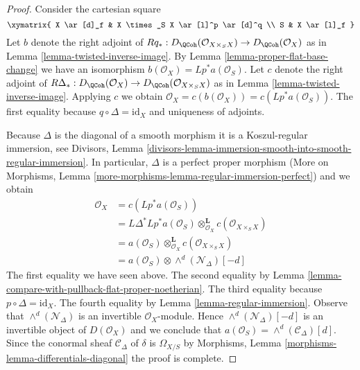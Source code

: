 \begin{proof}
Consider the cartesian square
$$
\xymatrix{
X \ar[d]_f & X \times_S X \ar[l]^p \ar[d]^q \\
S & X \ar[l]_f
}
$$
Let $b$ denote the right adjoint of
$Rq_* : D_\QCoh(\mathcal{O}_{X \times_S X}) \to D_\QCoh(\mathcal{O}_X)$
as in Lemma \ref{lemma-twisted-inverse-image}.
By Lemma \ref{lemma-proper-flat-base-change}
we have an isomorphism
$b(\mathcal{O}_X) = Lp^*a(\mathcal{O}_S)$.
Let $c$ denote the right adjoint of
$R\Delta_* : D_\QCoh(\mathcal{O}_X) \to D_\QCoh(\mathcal{O}_{X \times_S X})$
as in Lemma \ref{lemma-twisted-inverse-image}.
Applying $c$ we obtain
$\mathcal{O}_X = c(b(\mathcal{O}_X)) = c(Lp^*a(\mathcal{O}_S))$.
The first equality because $q \circ \Delta = \text{id}_X$ and
uniqueness of adjoints.

\medskip\noindent
Because $\Delta$ is the diagonal of a smooth morphism it is a
Koszul-regular immersion, see
Divisors, Lemma
\ref{divisors-lemma-immersion-smooth-into-smooth-regular-immersion}.
In particular, $\Delta$ is a perfect proper morphism
(More on Morphisms, Lemma \ref{more-morphisms-lemma-regular-immersion-perfect})
and we obtain
\begin{align*}
\mathcal{O}_X
& =
c(Lp^*a(\mathcal{O}_S)) \\
& =
L\Delta^*Lp^*a(\mathcal{O}_S) \otimes_{\mathcal{O}_X}^\mathbf{L}
c(\mathcal{O}_{X \times_S X}) \\
& =
a(\mathcal{O}_S) \otimes_{\mathcal{O}_X}^\mathbf{L}
c(\mathcal{O}_{X \times_S X}) \\
& =
a(\mathcal{O}_S) \otimes \wedge^d(\mathcal{N}_\Delta)[-d]
\end{align*}
The first equality we have seen above.
The second equality by
Lemma \ref{lemma-compare-with-pullback-flat-proper-noetherian}.
The third equality because $p \circ \Delta = \text{id}_X$.
The fourth equality by Lemma \ref{lemma-regular-immersion}.
Observe that $\wedge^d(\mathcal{N}_\Delta)$ is an invertible
$\mathcal{O}_X$-module. Hence $\wedge^d(\mathcal{N}_\Delta)[-d]$
is an invertible object of $D(\mathcal{O}_X)$ and we conclude
that $a(\mathcal{O}_S) = \wedge^d(\mathcal{C}_\Delta)[d]$.
Since the conormal sheaf $\mathcal{C}_\Delta$ of $\delta$ is
$\Omega_{X/S}$ by
Morphisms, Lemma \ref{morphisms-lemma-differentials-diagonal}
the proof is complete.
\end{proof}

